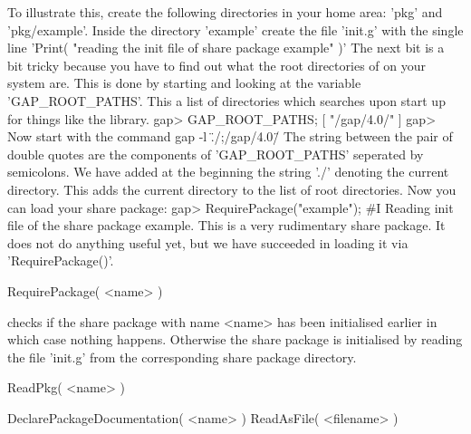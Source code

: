 To illustrate this, create  the following directories  in your home area:
'pkg' and  'pkg/example'.  Inside the directory  'example'  create the
file 'init.g' with the single line
\begintt
'Print( "reading the init file of share package example" )'
\endtt
The next bit is a bit tricky  because you have  to find out what the root
directories of {\GAP}  on your  system are.   This  is done by   starting
{\GAP}  and looking  at the  variable  'GAP_ROOT_PATHS'.  This a list  of
directories which {\GAP}  searches upon   start  up for things like   the
{\GAP} library.
\begintt
gap> GAP_ROOT_PATHS;
[ "/gap/4.0/" ]
gap> 
\endtt
Now start {\GAP} with the command 
\beginitems
gap -l \"./;/gap/4.0/\"
\enditems
The  string between the  pair  of double quotes    are the components  of
'GAP_ROOT_PATHS' seperated by semicolons.  We have added at the beginning
the string  './' denoting the  current directory.  This  adds the current
directory to the list of {\GAP} root directories.   Now you can load your
share package:
\beginitems
gap> RequirePackage("example");
\#I  Reading init file of the share package example.
\enditems
This is a very rudimentary share package.  It does not do anything useful
yet, but we have succeeded in loading it via 'RequirePackage()'.





\>RequirePackage( <name> )

checks if the share package with name <name> has been initialised earlier
in  which   case  nothing  happens.   Otherwise    the share   package is
initialised  by reading the file  'init.g'  from the corresponding  share
package directory.

\>ReadPkg( <name> )

\>DeclarePackageDocumentation( <name> )
\>ReadAsFile( <filename> )


